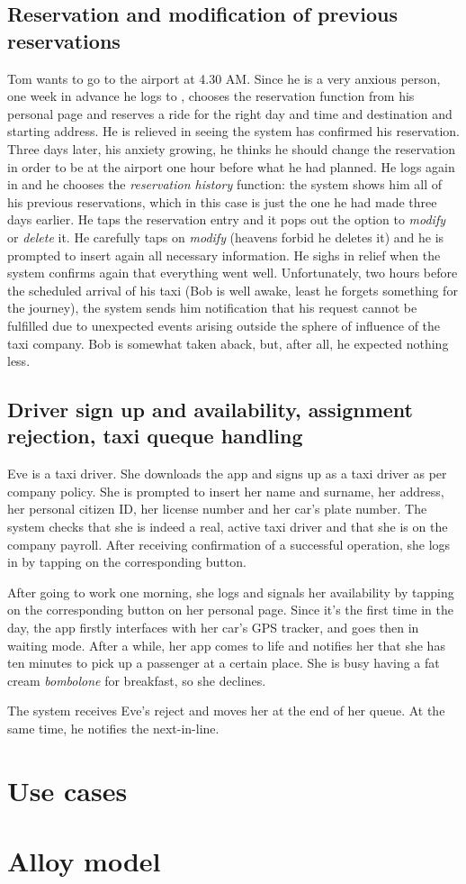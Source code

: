 \subsection{Reservation and modification of previous reservations}
Tom wants to go to the airport at 4.30 AM. Since he is a very anxious person, one week in advance he logs to \mts{}, chooses the reservation function from his personal page and reserves a ride for the right day and time and destination and starting address. He is relieved in seeing the system has confirmed his reservation.
Three days later, his anxiety growing, he thinks he should change the reservation in order to be at the airport one hour before what he had planned. He logs again in \mts{} and he chooses the \emph{reservation history} function: the system shows him all of his previous reservations, which in this case is just the one he had made three days earlier. He taps the reservation entry and it pops out the option to \emph{modify} or \emph{delete} it. He carefully taps on \emph{modify} (heavens forbid he deletes it) and he is prompted to insert again all necessary information. He sighs in relief when the system confirms again that everything went well.
Unfortunately, two hours before the scheduled arrival of his taxi (Bob is well awake, least he forgets something for the journey), the system sends him notification that his request cannot be fulfilled due to unexpected events arising outside the sphere of influence of the taxi company. Bob is somewhat taken aback, but, after all, he expected nothing less.

\subsection{Driver sign up and availability, assignment rejection, taxi queque handling}
Eve is a taxi driver. She downloads the \mts{} app and signs up as a taxi driver as per company policy. She is prompted to insert her name and surname, her address, her personal citizen ID, her license number and her car's plate number. The system checks that she is indeed a real, active taxi driver and that she is on the company payroll. After receiving confirmation of a successful operation, she logs in by tapping on the corresponding button.

After going to work one morning, she logs and signals her availability by tapping on the corresponding button on her personal page. Since it's the first time in the day, the app firstly interfaces with her car's GPS tracker, and goes then in waiting mode. After a while, her app comes to life and notifies her that she has ten minutes to pick up a passenger at a certain place. She is busy having a fat cream \emph{bombolone} for breakfast, so she declines.

The system receives Eve's reject and moves her at the end of her queue. At the same time, he notifies the next-in-line.

\section{Use cases}

\section{Alloy model}